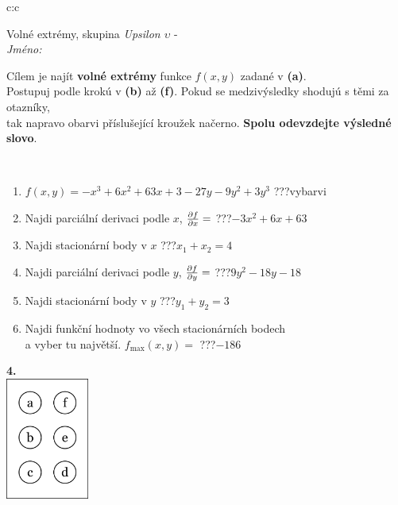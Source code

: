 \documentclass[10pt]{report}
\begin{document}
\begin{tabular}{c:c}
\begin{minipage}[c][104.5mm][t]{0.5\linewidth}
\begin{center}
\vspace{7mm}
{\huge Volné extrémy, skupina \textit{Upsilon $\upsilon$} -}\\[5mm]
\textit{Jméno:}\phantom{xxxxxxxxxxxxxxxxxxxxxxxxxxxxxxxxxxxxxxxxxxxxxxxxxxxxxxxxxxxxxxxxx}\\[5mm]
\begin{minipage}{0.95\linewidth}
\begin{center}
Cílem je najít \textbf{volné extrémy} funkce $f(x,y)$ zadané v \textbf{(a)}.\\Postupuj podle krokú v \textbf{(b)} až \textbf{(f)}. Pokud se medzivýsledky shodujú s těmi za otazníky,\\tak napravo obarvi příslušející kroužek načerno. \textbf{Spolu odevzdejte výsledné slovo}.
\end{center}
\end{minipage}
\\[1mm]
\begin{minipage}{0.79\linewidth}
\begin{center}
\begin{varwidth}{\linewidth}
\begin{enumerate}
\normalsize
\item $f(x,y)=-x^3+6x^2+63x+3-27y-9y^2+3y^3$\quad \dotfill\; ???\;\dotfill \quad vybarvi
\item Najdi parciální derivaci podle $x$, $\pdv{f}{x}=$\quad \dotfill\; ???\;\dotfill \quad $-3x^2+6x+63$
\item Najdi stacionární body v $x$\quad \dotfill\; ???\;\dotfill \quad $x_1+x_2=4$
\item Najdi parciální derivaci podle $y$, $\pdv{f}{y}=$\quad \dotfill\; ???\;\dotfill \quad $9y^2-18y-18$
\item Najdi stacionární body v $y$\quad \dotfill\; ???\;\dotfill \quad $y_1+y_2=3$
\item Najdi funkční hodnoty vo všech stacionárních bodech \\ \phantom{xxxxxx} a vyber tu najvětší. $f_{\text{max}}(x,y)=$\quad \dotfill\; ???\;\dotfill \quad $-186$
\end{enumerate}
\end{varwidth}
\end{center}
\end{minipage}
\begin{minipage}{0.20\linewidth}
\begin{center}
{\Huge\bfseries 4.} \\[2mm]
\includegraphics[height=40mm]{../images/braille.png}

\end{center}
\end{minipage}
\end{center}
\end{minipage}
\end{tabular}
\end{document}
